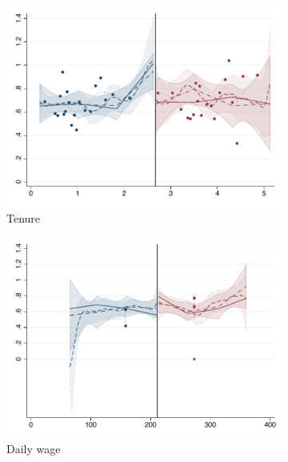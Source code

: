 \documentclass[oneside,11pt]{article}
\begin{document}
\begin{figure}[H]
     \caption{RD plots (Calculator + letter treatment) - Effect on solved conflict}
    \label{rd_t3}
\begin{center}
\begin{subfigure}{0.31\textwidth}

\caption{Tenure}
        \includegraphics[width=\textwidth]{Figuras/rdplot_conflicto_arreglado_tenure_3.pdf}
    \end{subfigure}
    \begin{subfigure}{0.31\textwidth}
\caption{Daily wage}
        \includegraphics[width=\textwidth]{Figuras/rdplot_conflicto_arreglado_dw_3.pdf}
    \end{subfigure}        
    \begin{subfigure}{0.31\textwidth}

\end{subfigure}
\end{center}
\end{figure}
\end{document}
